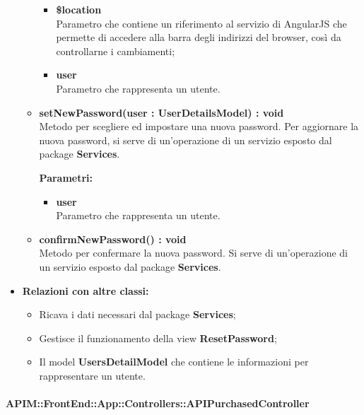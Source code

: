 \begin{itemize}
\begin{itemize}
\begin{itemize}
				\item \textbf{\$location}\\
				Parametro che contiene un riferimento al servizio di AngularJS che permette di accedere alla barra degli indirizzi del browser, così da controllarne i cambiamenti;
				
				\item \textbf{user}\\
				Parametro che rappresenta un utente.
			\end{itemize}
			
			\item \textbf{setNewPassword(user : UserDetailsModel) : void}\\
			Metodo per scegliere ed impostare una nuova password. Per aggiornare la nuova password, si serve di un'operazione di un servizio esposto dal package \textbf{Services}.
			\begin{description}
    			\item[\textbf{Parametri:}]
			\end{description}
			\begin{itemize}
				\item \textbf{user}\\
				Parametro che rappresenta un utente.
			\end{itemize}
			
			\item \textbf{ confirmNewPassword() : void}\\
			Metodo per confermare la nuova password. Si serve di un'operazione di un servizio esposto dal package \textbf{Services}.
			
		\end{itemize}
	\item \textbf{Relazioni con altre classi:}
		\begin{itemize}
			\item Ricava i dati necessari dal package \textbf{Services};
			\item Gestisce il funzionamento della view \textbf{ResetPassword};
			\item Il model \textbf{UsersDetailModel} che contiene le informazioni per rappresentare un utente.
		\end{itemize}
\end{itemize}

\paragraph{APIM::FrontEnd::App::Controllers::APIPurchasedController}

